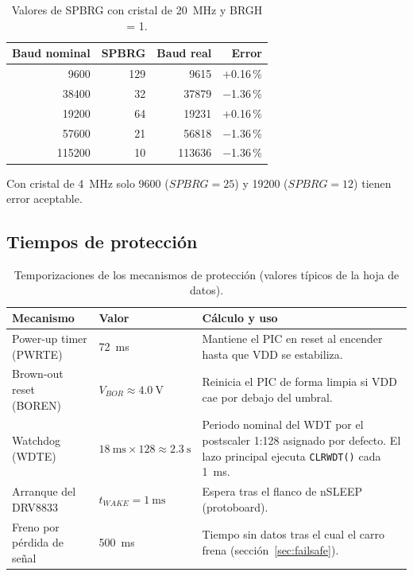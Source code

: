 \begin{table}[H]
  \centering
  \caption{Valores de SPBRG con cristal de \SI{20}{\mega\hertz} y BRGH = 1.}
  \label{tab:uart}
  \begin{tabular}{@{}r r r r@{}}
    \toprule
    \textbf{Baud nominal} & \textbf{SPBRG} & \textbf{Baud real} & \textbf{Error} \\
    \midrule
    9600   & 129 & 9615   & +0.16\,\% \\
    38400  & 32  & 37879  & $-$1.36\,\% \\
    19200  & 64  & 19231  & +0.16\,\% \\
    57600  & 21  & 56818  & $-$1.36\,\% \\
    115200 & 10  & 113636 & $-$1.36\,\% \\
    \bottomrule
  \end{tabular}
\end{table}
Con cristal de \SI{4}{\mega\hertz} solo 9600 ($SPBRG = 25$) y 19200
($SPBRG = 12$) tienen error aceptable.

\subsection{Tiempos de protección}

\begin{table}[H]
  \centering
  \caption{Temporizaciones de los mecanismos de protección (valores típicos de la hoja de datos).}
  \label{tab:proteccion}
  \small
  \begin{tabularx}{\textwidth}{@{}l l L@{}}
    \toprule
    \textbf{Mecanismo} & \textbf{Valor} & \textbf{Cálculo y uso} \\
    \midrule
    Power-up timer (PWRTE) & \SI{72}{\milli\second} & Mantiene el PIC en reset al encender hasta que VDD se estabiliza. \\
    Brown-out reset (BOREN) & $V_{BOR} \approx \SI{4.0}{\volt}$ & Reinicia el PIC de forma limpia si VDD cae por debajo del umbral. \\
    Watchdog (WDTE) & $\SI{18}{\milli\second}\times 128 \approx \SI{2.3}{\second}$ & Periodo nominal del WDT por el postscaler 1:128 asignado por defecto. El lazo principal ejecuta \texttt{CLRWDT()} cada \SI{1}{\milli\second}. \\
    Arranque del DRV8833 & $t_{WAKE} = \SI{1}{\milli\second}$ & Espera tras el flanco de nSLEEP (protoboard). \\
    Freno por pérdida de señal & \SI{500}{\milli\second} & Tiempo sin datos tras el cual el carro frena (sección~\ref{sec:failsafe}). \\
    \bottomrule
  \end{tabularx}
\end{table}

